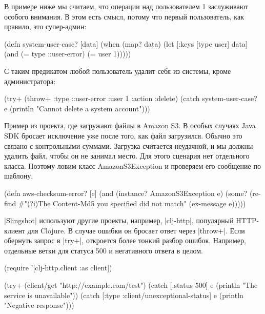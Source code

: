 В примере ниже мы считаем, что операции над пользователем 1 заслуживают особого
внимания. В этом есть смысл, потому что первый пользователь, как правило, это
супер-админ:

\begin{english}
  \begin{clojure}
(defn system-user-case? [data]
  (when (map? data)
    (let [{:keys [type user]} data]
      (and (= type ::user-error)
           (= user 1)))))
  \end{clojure}
\end{english}

С таким предикатом любой пользователь удалит себя из системы, кроме
администратора:

\begin{english}
  \begin{clojure}
(try+
 (throw+ {:type ::user-error
          :user 1
          :action :delete})
 (catch system-user-case? e
   (println "Cannot delete a system account")))
  \end{clojure}
\end{english}

Пример из проекта, где загружают файлы в Amazon S3. В особых случаях Java SDK
бросает исключение уже после того, как файл загрузился. Обычно это связано с
контрольными суммами. Загрузка считается неудачной, и мы должны удалить файл,
чтобы он не занимал место. Для этого сценария нет отдельного класса. Поэтому
ловим класс AmazonS3Exception и проверяем его сообщение по шаблону.

\begin{english}
  \begin{clojure}
(defn aws-checksum-error? [e]
  (and (instance? AmazonS3Exception e)
       (some?
        (re-find
         #"(?i)The Content-Md5 you specified did not match"
         (ex-message e)))))
  \end{clojure}
\end{english}

\spverb|Slingshot| используют другие проекты, например,
\spverb|clj-http|, популярный HTTP-клиент
для Clojure. В случае ошибки он бросает ответ через \spverb|throw+|. Если
обернуть запрос в \spverb|try+|, откроется более тонкий разбор ошибок. Например,
отдельные ветки для статуса 500 и негативного ответа в целом.

\begin{english}
  \begin{clojure}
(require '[clj-http.client :as client])

(try+
 (client/get "http://example.com/test")
 (catch [:status 500] e
   (println "The service is unavailable"))
 (catch [:type :client/unexceptional-status] e
   (println "Negative response")))
  \end{clojure}
\end{english}

